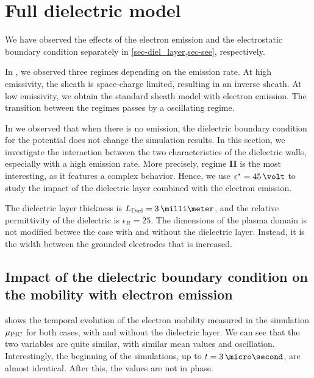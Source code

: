 
\section{Full dielectric model }
  \label{sec-fulldiel}
  
  We have observed the effects of the electron emission and the electrostatic boundary condition separately in \cref{sec-diel_layer,sec-see}, respectively.
  
  
  In , we observed three regimes depending on the emission rate.
  At high emissivity, the sheath is space-charge limited, resulting in an inverse sheath.
  At low emissivity, we obtain the standard sheath model with electron emission.
  The transition between the regimes passes by a oscillating regime.
  
  In  we observed that when there is no emission, the dielectric boundary condition for the potential does not change the simulation results.
  In this section, we investigate the interaction between the two characteristics of the dielectric walls, especially with a high emission rate.
  More precisely, regime {\bf II} is the most interesting, as it features a complex behavior.
  Hence, we use $\crover=45\,\volt$ to study the impact of the dielectric layer combined with the electron emission.
  
  The dielectric layer thickness is $L_{\rm Diel} = 3\,\milli\meter$, and the relative permittivity of the dielectric is $\epsilon_R=25$.
  The dimensions of the plasma domain is not modified betwee the case with and without the dielectric layer.
  Instead, it is the width between the grounded electrodes that is increased.
  
  \subsection{Impact of the dielectric boundary condition on the mobility with electron emission}
    
     shows the temporal evolution of the electron mobility measured in the simulation $\mu_{\mathrm{PIC}}$ for both cases, with and without the dielectric layer.
    We can see that the two variables are quite similar, with similar mean values and oscillation.
    Interestingly, the beginning of the simulations, up to $t=3\,\micro\second$, are almost identical.
    After this, the values are not in phase.
    
